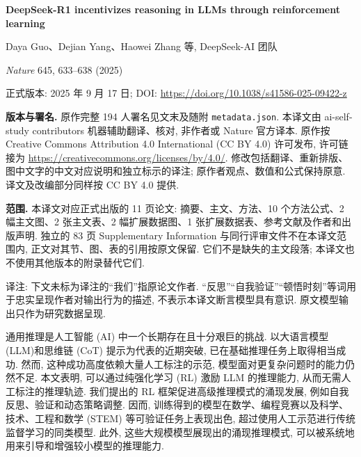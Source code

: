 \label{r1n-paper}
\begin{center}
\textbf{DeepSeek-R1 incentivizes reasoning in LLMs through reinforcement learning}\par
Daya Guo、Dejian Yang、Haowei Zhang 等, DeepSeek-AI 团队\par
\textit{Nature} 645, 633--638 (2025)\par
正式版本: 2025 年 9 月 17 日; DOI: \url{https://doi.org/10.1038/s41586-025-09422-z}
\end{center}
\noindent\textbf{版本与署名.} 原作完整 194 人署名见文末及随附 \texttt{metadata.json}. 本译文由 ai-self-study contributors 机器辅助翻译、核对, 非作者或 Nature 官方译本. 原作按 Creative Commons Attribution 4.0 International (CC BY 4.0) 许可发布, 许可链接为 \url{https://creativecommons.org/licenses/by/4.0/}. 修改包括翻译、重新排版、图中文字的中文对应说明和独立标示的译注; 原作者观点、数值和公式保持原意. 译文及改编部分同样按 CC BY 4.0 提供.

\noindent\textbf{范围.} 本译文对应正式出版的 11 页论文: 摘要、主文、方法、10 个方法公式、2 幅主文图、2 张主文表、2 幅扩展数据图、1 张扩展数据表、参考文献及作者和出版声明. 独立的 83 页 Supplementary Information 与同行评审文件不在本译文范围内, 正文对其节、图、表的引用按原文保留. 它们不是缺失的主文段落; 本译文也不使用其他版本的附录替代它们.

\begin{remark}
译注: 下文未标为译注的“我们”指原论文作者. “反思”“自我验证”“顿悟时刻”等词用于忠实呈现作者对输出行为的描述, 不表示本译文断言模型具有意识. 原文模型输出只作为研究数据呈现.
\end{remark}

\label{r1n-abstract}
通用推理是人工智能 (AI) 中一个长期存在且十分艰巨的挑战. 以大语言模型 (LLM)\cite{r1n-ref1,r1n-ref2}和思维链 (CoT) 提示\cite{r1n-ref3}为代表的近期突破, 已在基础推理任务上取得相当成功. 然而, 这种成功高度依赖大量人工标注的示范, 模型面对更复杂问题时的能力仍然不足. 本文表明, 可以通过纯强化学习 (RL) 激励 LLM 的推理能力, 从而无需人工标注的推理轨迹. 我们提出的 RL 框架促进高级推理模式的涌现发展, 例如自我反思、验证和动态策略调整. 因而, 训练得到的模型在数学、编程竞赛以及科学、技术、工程和数学 (STEM) 等可验证任务上表现出色, 超过使用人工示范进行传统监督学习的同类模型. 此外, 这些大规模模型展现出的涌现推理模式, 可以被系统地用来引导和增强较小模型的推理能力.

